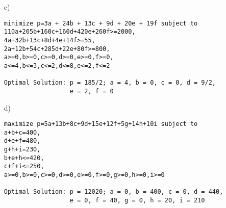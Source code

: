 \documentclass[a4paper,11pt]{article}
\begin{document}
\begin{enumerate}
\begin{enumerate}
    \item[c)]
        \begin{verbatim}
minimize p=3a + 24b + 13c + 9d + 20e + 19f subject to
110a+205b+160c+160d+420e+260f>=2000,
4a+32b+13c+8d+4e+14f>=55,
2a+12b+54c+285d+22e+80f>=800,
a>=0,b>=0,c>=0,d>=0,e>=0,f>=0,
a<=4,b<=3,c<=2,d<=8,e<=2,f<=2

Optimal Solution: p = 185/2; a = 4, b = 0, c = 0, d = 9/2,
                  e = 2, f = 0
        \end{verbatim}

    \item[d)]
        \begin{verbatim}
maximize p=5a+13b+8c+9d+15e+12f+5g+14h+10i subject to
a+b+c=400,
d+e+f=480,
g+h+i=230,
b+e+h<=420,
c+f+i<=250,
a>=0,b>=0,c>=0,d>=0,e>=0,f>=0,g>=0,h>=0,i>=0

Optimal Solution: p = 12020; a = 0, b = 400, c = 0, d = 440,
                  e = 0, f = 40, g = 0, h = 20, i = 210
        \end{verbatim}
    \end{enumerate}
\end{enumerate}
\end{document}
